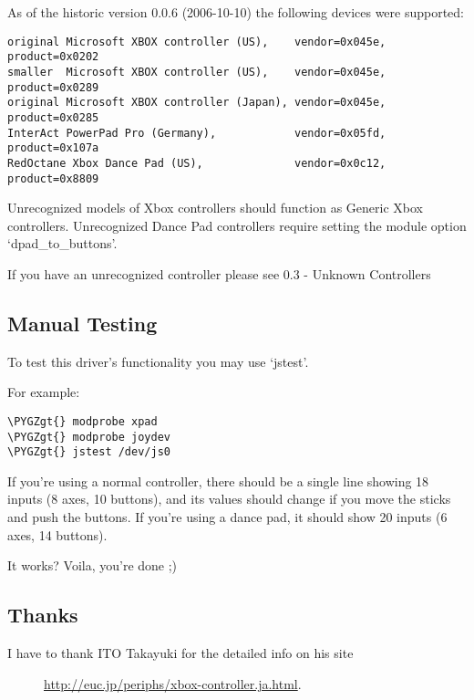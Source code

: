 \documentclass[a4paper,8pt,english]{sphinxmanual}
\def\PYGZgt{\char`\>}
\begin{document}
As of the historic version 0.0.6 (2006-10-10) the following devices
were supported:

\begin{Verbatim}[commandchars=\\\{\}]
original Microsoft XBOX controller (US),    vendor=0x045e, product=0x0202
smaller  Microsoft XBOX controller (US),    vendor=0x045e, product=0x0289
original Microsoft XBOX controller (Japan), vendor=0x045e, product=0x0285
InterAct PowerPad Pro (Germany),            vendor=0x05fd, product=0x107a
RedOctane Xbox Dance Pad (US),              vendor=0x0c12, product=0x8809
\end{Verbatim}

Unrecognized models of Xbox controllers should function as Generic
Xbox controllers. Unrecognized Dance Pad controllers require setting
the module option `dpad\_to\_buttons'.

If you have an unrecognized controller please see 0.3 - Unknown Controllers


\subsection{Manual Testing}
\label{input/devices/xpad:manual-testing}
To test this driver's functionality you may use `jstest'.

For example:

\begin{Verbatim}[commandchars=\\\{\}]
\PYGZgt{} modprobe xpad
\PYGZgt{} modprobe joydev
\PYGZgt{} jstest /dev/js0
\end{Verbatim}

If you're using a normal controller, there should be a single line showing
18 inputs (8 axes, 10 buttons), and its values should change if you move
the sticks and push the buttons.  If you're using a dance pad, it should
show 20 inputs (6 axes, 14 buttons).

It works? Voila, you're done ;)


\subsection{Thanks}
\label{input/devices/xpad:thanks}\begin{description}
\item[{I have to thank ITO Takayuki for the detailed info on his site}] \leavevmode
\href{http://euc.jp/periphs/xbox-controller.ja.html}{http://euc.jp/periphs/xbox-controller.ja.html}.

\end{description}
\end{document}
